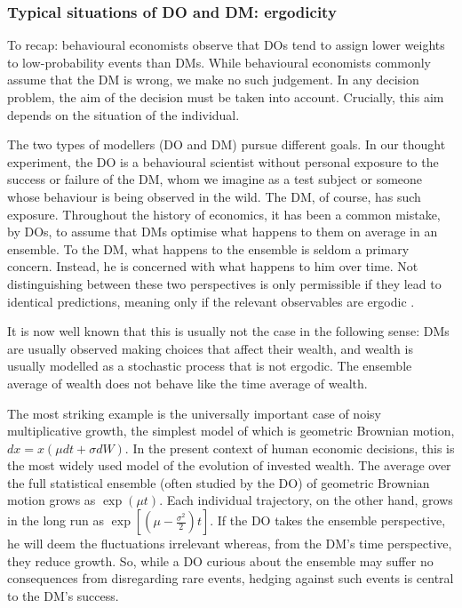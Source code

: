 \documentclass[a4paper, 12pt]{article}
\begin{document}
\subsubsection{Typical situations of DO and DM: ergodicity}
To recap: behavioural economists observe that DOs tend to assign lower weights to low-probability events than DMs. While behavioural economists commonly assume that the DM is wrong, we make no such judgement. In any decision problem, the aim of the decision must be taken into account. Crucially, this aim depends on the situation of the individual.

The two types of modellers (DO and DM) pursue different goals. In our thought experiment, the DO is a behavioural scientist without personal exposure to the success or failure of the DM, whom we imagine as a test subject or someone whose behaviour is being observed in the wild. The DM, of course, has such exposure. Throughout the history of economics, it has been a common mistake, by DOs, to assume that DMs optimise what happens to them on average in an ensemble. To the DM, what happens to the ensemble is seldom a primary concern. Instead, he is concerned with what happens to him over time. Not distinguishing between these two perspectives is only permissible if they lead to identical predictions, meaning only if the relevant observables are ergodic \parencite{Peters2019b}.

It is now well known that this is usually not the case in the following sense: DMs are usually observed making choices that affect their wealth, and wealth is usually modelled as a stochastic process that is not ergodic. The ensemble average of wealth does not behave like the time average of wealth.

The most striking example is the universally important case of noisy multiplicative growth, the simplest model of which is geometric Brownian motion, $dx=x(\mu dt+\sigma dW)$. In the present context of human economic decisions, this is the most widely used model of the evolution of invested wealth. The average over the full statistical ensemble (often studied by the DO) of geometric Brownian motion grows as $\exp(\mu t)$. Each individual trajectory, on the other hand, grows in the long run as $\exp[(\mu-\frac{\sigma^2}{2})t]$. If the DO takes the ensemble perspective, he will deem the fluctuations irrelevant whereas, from the DM's time perspective, they reduce growth. So, while a DO curious about the ensemble may suffer no consequences from disregarding rare events, hedging against such events is central to the DM's success.
\end{document}
